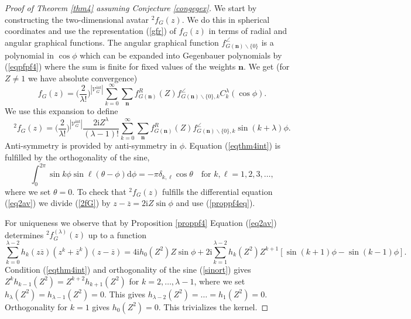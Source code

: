\documentclass[oneside]{amsart}
\newcommand{\ii}{\mathrm{i}}
\newcommand{\dd}{\mathrm{d}}
\newcommand{\zz}{{\overline{z}}}
\newcommand{\sV}{\mathcal{V}}
\newcommand{\sVGint}{{\sV_G^\mathrm{int}}}
\newcommand{\VGint}{{|\sVGint|}}
\theoremstyle{plain}
\begin{document}
\begin{proof}[Proof of Theorem \ref{thm4} assuming Conjecture \ref{congegex}]
We start by constructing the two-dimensional avatar ${}^2\!f_G(z)$. We do this in spherical coordinates and use the representation (\ref{gfr}) of $f_G(z)$ in terms
of radial and angular graphical functions. The angular graphical function $f_{G(\mathbf n)\backslash\{0\}}^\angle$ is a polynomial in $\cos\phi$ which can be expanded into
Gegenbauer polynomials by (\ref{eqpfpf4}) where the sum is finite for fixed values of the weights $\mathbf n$. We get (for $Z\neq1$ we have absolute convergence)
$$
f_G(z)=\Big(\frac{2}{\lambda!}\Big)^\VGint\sum_{k=0}^\infty\sum_{\mathbf n}f_{G(\mathbf n)}^R(Z)f_{G(\mathbf n)\backslash\{0\},k}^\angle C^\lambda_k(\cos\phi).
$$
We use this expansion to define
\begin{equation}\label{2fG}
{}^2\!f_G(z)=\Big(\frac{2}{\lambda!}\Big)^\VGint\frac{2\ii Z^\lambda}{(\lambda-1)!}\sum_{k=0}^\infty\sum_{\mathbf n}f_{G(\mathbf n)}^R(Z)f_{G(\mathbf n)\backslash\{0\},k}^\angle
\sin(k+\lambda)\phi.
\end{equation}
Anti-symmetry is provided by anti-symmetry in $\phi$. Equation (\ref{eqthm4int}) is fulfilled by the orthogonality of the sine,
\begin{equation}\label{sinort}
\int_0^{2\pi}\sin k\phi\sin\ell(\theta-\phi)\dd\phi=-\pi\delta_{k,\ell}\cos\theta\quad\text{for }k,\ell=1,2,3,\ldots,
\end{equation}
where we set $\theta=0$. To check that ${}^2\!f_G(z)$ fulfills the differential equation (\ref{eq2av}) we divide (\ref{2fG}) by $z-\zz=2\ii Z\sin\phi$ and use (\ref{proppf4eq}).

For uniqueness we observe that by Proposition \ref{proppf4} Equation (\ref{eq2av}) determines ${}^2\!f^{(\lambda)}_G(z)$ up to a function
$$
\sum_{k=0}^{\lambda-2}h_k(z\zz)(z^k+\zz^k)(z-\zz)=4\ii h_0(Z^2)Z\sin\phi+2\ii\sum_{k=1}^{\lambda-2}h_k(Z^2)Z^{k+1}[\sin(k+1)\phi-\sin(k-1)\phi].
$$
Condition (\ref{eqthm4int}) and orthogonality of the sine (\ref{sinort}) gives $Z^kh_{k-1}(Z^2)=Z^{k+2}h_{k+1}(Z^2)$ for $k=2,\ldots,\lambda-1$, where we set $h_\lambda(Z^2)=h_{\lambda-1}(Z^2)=0$.
This gives $h_{\lambda-2}(Z^2)=\ldots=h_1(Z^2)=0$. Orthogonality for $k=1$ gives $h_0(Z^2)=0$. This trivializes the kernel.


\end{proof}
\end{document}
